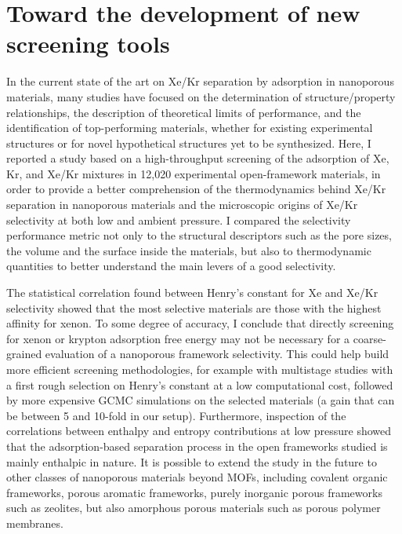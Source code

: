 \documentclass[main.tex]{subfiles}
\begin{document}
\section{Toward the development of new screening tools}

In the current state of the art on Xe/Kr separation by adsorption in nanoporous materials, many studies have focused on the determination of structure/property relationships, the description of theoretical limits of performance, and the identification of top-performing materials, whether for existing experimental structures or for novel hypothetical structures yet to be synthesized. Here, I reported a study based on a high-throughput screening of the adsorption of Xe, Kr, and Xe/Kr mixtures in 12,020 experimental open-framework materials, in order to provide a better comprehension of the thermodynamics behind Xe/Kr separation in nanoporous materials and the microscopic origins of Xe/Kr selectivity at both low and ambient pressure. I compared the selectivity performance metric  not only to the structural descriptors such as the pore sizes, the volume and the surface inside the materials, but also to thermodynamic quantities to better understand the main levers of a good selectivity.

The statistical correlation found between Henry's constant for Xe and Xe/Kr selectivity showed that the most selective materials are those with the highest affinity for xenon. To some degree of accuracy, I conclude that directly screening for xenon or krypton adsorption free energy may not be necessary for a coarse-grained evaluation of a nanoporous framework selectivity. This could help build more efficient screening methodologies, for example with multistage studies with a first rough selection on Henry's constant at a low computational cost, followed by more expensive GCMC simulations on the selected materials (a gain that can be between 5 and 10-fold in our setup). Furthermore, inspection of the correlations between enthalpy and entropy contributions at low pressure showed that the adsorption-based separation process in the open frameworks studied is mainly enthalpic in nature. It is possible to extend the study in the future to other classes of nanoporous materials beyond MOFs, including covalent organic frameworks, porous aromatic frameworks, purely inorganic porous frameworks such as zeolites, but also amorphous porous materials such as porous polymer membranes.
\end{document}
